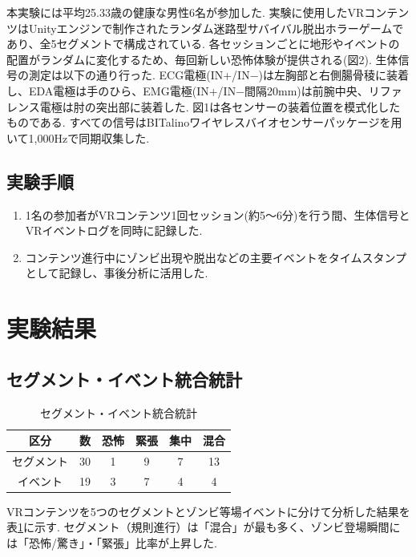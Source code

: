 \documentclass[a4paper]{jarticle}
\begin{document}
本実験には平均25.33歳の健康な男性6名が参加した. 実験に使用したVRコンテンツはUnityエンジンで制作されたランダム迷路型サバイバル脱出ホラーゲームであり、全5セグメントで構成されている. 各セッションごとに地形やイベントの配置がランダムに変化するため、毎回新しい恐怖体験が提供される(図2). 生体信号の測定は以下の通り行った. ECG電極(IN+/IN−)は左胸部と右側腸骨稜に装着し、EDA電極は手のひら、EMG電極(IN+/IN−間隔20mm)は前腕中央、リファレンス電極は肘の突出部に装着した. 図1は各センサーの装着位置を模式化したものである. すべての信号はBITalinoワイヤレスバイオセンサーパッケージを用いて1,000Hzで同期収集した.


\subsection{実験手順}%

\begin{enumerate} 
  \item 1名の参加者がVRコンテンツ1回セッション(約5〜6分)を行う間、生体信号とVRイベントログを同時に記録した. 
  \item コンテンツ進行中にゾンビ出現や脱出などの主要イベントをタイムスタンプとして記録し、事後分析に活用した.
\end{enumerate}

\section{実験結果}%

\subsection{セグメント・イベント統合統計}
\begin{table}[tb]
\caption{セグメント・イベント統合統計}
\label{table1}
\begin{center}\footnotesize
\def\arraystretch{1.1}
\begin{tabular}{|c|c|c|c|c|c|}\hline 
区分 & 数 & 恐怖 & 緊張 & 集中 & 混合 \\ \hline
セグメント & 30 & 1 & 9 & 7 & 13 \\ \hline
イベント & 19 & 3 & 7 & 4 & 4 \\ \hline
\end{tabular}
\end{center}
\vspace*{-3mm}
\end{table}

VRコンテンツを5つのセグメントとゾンビ等場イベントに分けて分析した結果を表\ref{table1}に示す.
セグメント（規則進行）は「混合」が最も多く、ゾンビ登場瞬間には「恐怖/驚き」・「緊張」比率が上昇した.
\end{document}
